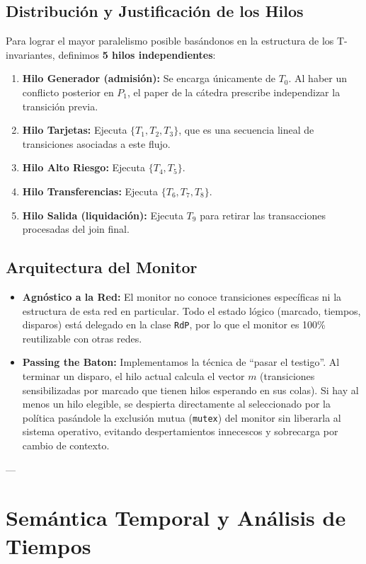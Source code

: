 \documentclass[12pt,a4paper]{article}
\begin{document}
\subsection{Distribución y Justificación de los Hilos}
Para lograr el mayor paralelismo posible basándonos en la estructura de los T-invariantes, definimos \textbf{5 hilos independientes}:
\begin{enumerate}
    \item \textbf{Hilo Generador (admisión):} Se encarga únicamente de $T_0$. Al haber un conflicto posterior en $P_1$, el paper de la cátedra prescribe independizar la transición previa.
    \item \textbf{Hilo Tarjetas:} Ejecuta $\{T_1, T_2, T_3\}$, que es una secuencia lineal de transiciones asociadas a este flujo.
    \item \textbf{Hilo Alto Riesgo:} Ejecuta $\{T_4, T_5\}$.
    \item \textbf{Hilo Transferencias:} Ejecuta $\{T_6, T_7, T_8\}$.
    \item \textbf{Hilo Salida (liquidación):} Ejecuta $T_9$ para retirar las transacciones procesadas del join final.
\end{enumerate}

\subsection{Arquitectura del Monitor}
\begin{itemize}
    \item \textbf{Agnóstico a la Red:} El monitor no conoce transiciones específicas ni la estructura de esta red en particular. Todo el estado lógico (marcado, tiempos, disparos) está delegado en la clase \texttt{RdP}, por lo que el monitor es 100\% reutilizable con otras redes.
    \item \textbf{Passing the Baton:} Implementamos la técnica de ``pasar el testigo''. Al terminar un disparo, el hilo actual calcula el vector $m$ (transiciones sensibilizadas por marcado que tienen hilos esperando en sus colas). Si hay al menos un hilo elegible, se despierta directamente al seleccionado por la política pasándole la exclusión mutua (\texttt{mutex}) del monitor sin liberarla al sistema operativo, evitando despertamientos innecescos y sobrecarga por cambio de contexto.
\end{itemize}

---

\section{Semántica Temporal y Análisis de Tiempos}
\end{document}
